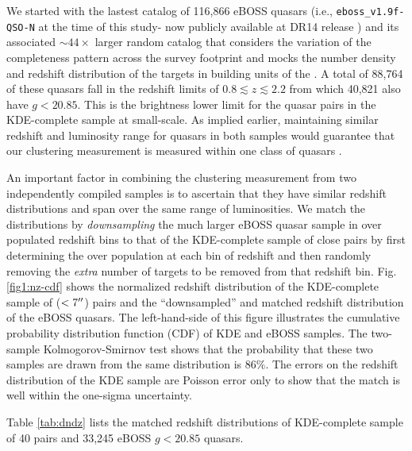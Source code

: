 \documentclass[useAMS,usenatbib]{mn2e}
\begin{document}
We started with the lastest catalog of 116{,}866 eBOSS quasars (i.e., {\tt eboss\_v1.9f-QSO-N} at the time of this study- now publicly available at  DR14 release \citet{dr14}) and its associated $\sim 44 \times$ larger random catalog that considers the variation of the completeness pattern across the survey footprint and mocks the number density and redshift distribution of the targets in building units of the \citet[see][]{sw08b,la17}. A total of 88{,}764 of these quasars fall in the redshift limits of $0.8\lesssim z \lesssim 2.2$ from which 40{,}821 also have $g<20.85$. This is the brightness lower limit for the quasar pairs in the KDE-complete sample at small-scale. As implied earlier, maintaining similar redshift and luminosity range for quasars in both samples would guarantee that our clustering measurement is measured within one class of quasars \citep[see, e.g., ][for discussions on whether quasars from different luminosity classes posses different clustering properties]{she07,All11,sh13,All14,ef15,mg16}.     

An important factor in combining the clustering measurement from two independently compiled samples is to ascertain that they have similar redshift distributions and span over the same range of luminosities. We match the distributions by {\it downsampling} the much larger eBOSS quasar sample in over populated redshift bins to that of the KDE-complete sample of close pairs by first determining the over population at each bin of redshift and then randomly removing the {\it extra} number of targets to be removed from that redshift bin. Fig. \ref{fig1:nz-cdf} shows the normalized redshift distribution of the KDE-complete sample of ($<7 \arcsec$) pairs and the ``downsampled'' and matched redshift distribution of the eBOSS quasars. The left-hand-side of this figure illustrates the cumulative probability distribution function (CDF) of KDE and eBOSS samples. The two-sample Kolmogorov-Smirnov test shows that the probability that these two samples are drawn from the same distribution is $86\%$. The errors on the redshift distribution of the KDE sample are Poisson error only to show that the match is well within the one-sigma uncertainty. 
 
 Table \ref{tab:dndz} lists the matched redshift distributions of KDE-complete sample of 40 pairs and 33{,}245 eBOSS $g<20.85$ quasars. 
  
\end{document}
